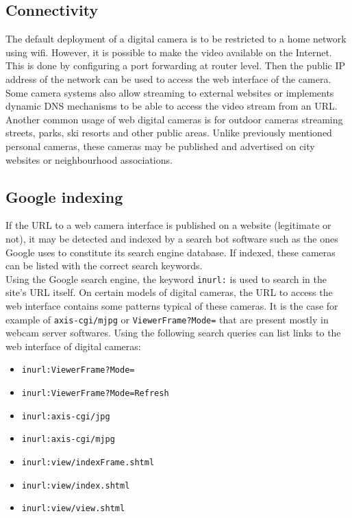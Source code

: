 \subsection{Connectivity}

The default deployment of a digital camera is to be restricted to a home network using wifi.
However, it is possible to make the video available on the Internet.
This is done by configuring a port forwarding at router level.
Then the public IP address of the network can be used to access the web interface of the camera.
Some camera systems also allow streaming to external websites or implements dynamic DNS mechanisms to be able to access the video stream from an URL.\\

Another common usage of web digital cameras is for outdoor cameras streaming streets, parks, ski resorts and other public areas.
Unlike previously mentioned personal cameras, these cameras may be published and advertised on city websites or neighbourhood associations.

\subsection{Google indexing}

If the URL to a web camera interface is published on a website (legitimate or not), it may be detected and indexed by a search bot software such as the ones Google uses to constitute its search engine database.
If indexed, these cameras can be listed with the correct search keywords.\\

Using the Google search engine, the keyword \texttt{inurl:} is used to search in the site's URL itself.
On certain models of digital cameras, the URL to access the web interface contains some patterns typical of these cameras.
It is the case for example of \texttt{axis-cgi/mjpg} or \texttt{ViewerFrame?Mode=} that are present mostly in webcam server softwares.
Using the following search queries can list links to the web interface of digital cameras:

\begin{itemize}
\item \texttt{inurl:ViewerFrame?Mode=}
\item \texttt{inurl:ViewerFrame?Mode=Refresh}
\item \texttt{inurl:axis-cgi/jpg}
\item \texttt{inurl:axis-cgi/mjpg}
\item \texttt{inurl:view/indexFrame.shtml}
\item \texttt{inurl:view/index.shtml}
\item \texttt{inurl:view/view.shtml}
\end{itemize}

